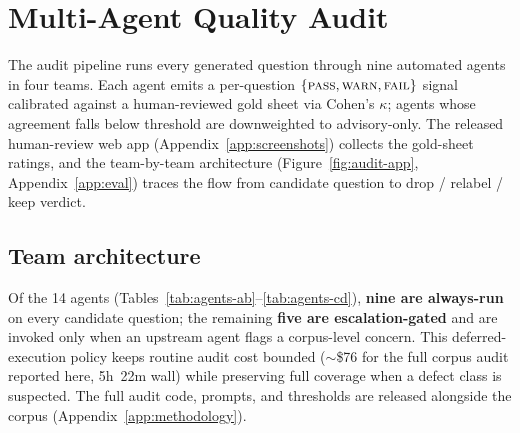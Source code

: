 \section{Multi-Agent Quality Audit}
\label{sec:audit}

The audit pipeline runs every generated question through nine
automated agents in four teams. Each agent emits a per-question
$\{\textsc{pass}, \textsc{warn}, \textsc{fail}\}$ signal calibrated
against a human-reviewed gold sheet via Cohen's $\kappa$; agents whose
agreement falls below threshold are downweighted to advisory-only.
The released human-review web app (Appendix~\ref{app:screenshots})
collects the gold-sheet ratings, and the team-by-team architecture
(Figure~\ref{fig:audit-app}, Appendix~\ref{app:eval}) traces the flow
from candidate question to drop / relabel / keep verdict.

\subsection{Team architecture}
\label{sec:audit-arch}

Of the 14 agents (Tables~\ref{tab:agents-ab}--\ref{tab:agents-cd}),
\textbf{nine are always-run} on every candidate question; the remaining
\textbf{five are escalation-gated} and are invoked only when an upstream
agent flags a corpus-level concern. This deferred-execution policy
keeps routine audit cost bounded ($\sim$\$76 for the full corpus audit
reported here, 5h~22m wall) while preserving full coverage when a
defect class is suspected. The full audit code, prompts, and thresholds
are released alongside the corpus (Appendix~\ref{app:methodology}).

